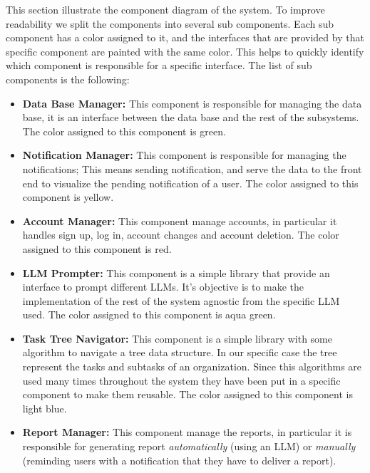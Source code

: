 \documentclass{article}
\begin{document}
This section illustrate the component diagram of the system. To improve readability we split the components into several sub
components.
Each sub component has a color assigned to it, and the interfaces that are provided by that specific component are painted with the same color.
This helps to quickly identify which component is responsible for a specific interface.
\newline \newline
The list of sub components is the following:
\begin{itemize}
    \item \textcolor[HTML]{8CC86E}{\textbf{Data Base Manager: }} This component is responsible for managing the data base, it is an interface between
          the data base and the rest of the subsystems. The color assigned to this component is \textcolor[HTML]{8CC86E}{green}.
    \item \textcolor[HTML]{F0C832}{\textbf{Notification Manager: }} This component is responsible for managing the notifications;
          This means sending notification, and serve the data to the front end to visualize the pending notification of a user. The color assigned to this component is \textcolor[HTML]{F0C832}{yellow}.
    \item \textcolor[HTML]{FF0000}{\textbf{Account Manager: }} This component manage accounts, in particular it handles sign up, log in, account changes and account deletion.
          The color assigned to this component is \textcolor[HTML]{FF0000}{red}.
    \item \textcolor[HTML]{64C8BE}{\textbf{LLM Prompter: }} This component is a simple library that provide an interface to prompt different LLMs. It's objective is to make the
          implementation of the rest of the system agnostic from the specific LLM used. The color assigned to this component is \textcolor[HTML]{64C8BE}{aqua green}.
    \item \textcolor[HTML]{A0C8F0}{\textbf{Task Tree Navigator: }} This component is a simple library with some algorithm to navigate a tree data structure.
          In our specific case the tree represent the tasks and subtasks of an organization. Since this algorithms are used many
          times throughout the system they have been put in a specific component to make them reusable. The color assigned to this component is \textcolor[HTML]{A0C8F0}{light blue}.
    \item \textcolor[HTML]{FA9646}{\textbf{Report Manager: }} This component manage the reports, in particular it is responsible for generating report \textit{automatically} (using an LLM) or \textit{manually} (reminding users with a notification that they have to deliver a report).

\end{itemize}
\end{document}
